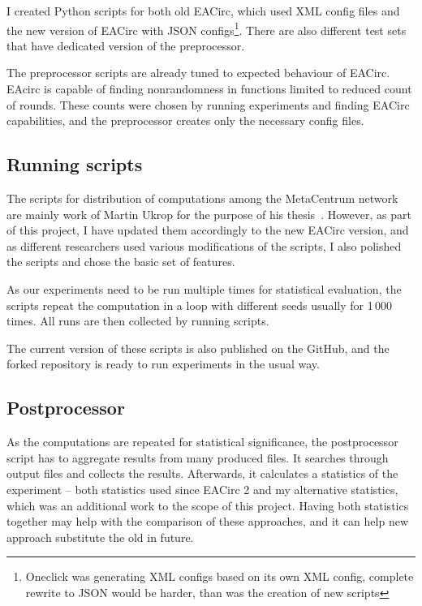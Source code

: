 \documentclass[
  print, %
  Table,   %
  nolof,     %
  nolot,     %
  draft, %
  11pt, %
  oneside  %
]{fithesis3}
\begin{document}
I created Python scripts for both old EACirc, which used XML config files and the new version of EACirc with JSON configs\footnote{Oneclick was generating XML configs based on its own XML config, complete rewrite to JSON would be harder, than was the creation of new scripts}. There are also different test sets that have dedicated version of the preprocessor.

The preprocessor scripts are already tuned to expected behaviour of EACirc. EAcirc is capable of finding nonrandomness in functions limited to reduced count of rounds. These counts were chosen by running experiments and finding EACirc capabilities, and the preprocessor creates only the necessary config files.

\subsection{Running scripts}

The scripts for distribution of computations among the MetaCentrum network are mainly work of Martin Ukrop for the purpose of his thesis~\cite{ukropMgrThesis}. However, as part of this project, I have updated them accordingly to the new EACirc version, and as different researchers used various modifications of the scripts, I also polished the scripts and chose the basic set of features.

As our experiments need to be run multiple times for statistical evaluation, the scripts repeat the computation in a loop with different seeds usually for 1\,000 times. All runs are then collected by running scripts.

The current version of these scripts is also published on the GitHub, and the forked repository is ready to run experiments in the usual way.

\subsection{Postprocessor}

As the computations are repeated for statistical significance, the postprocessor script has to aggregate results from many produced files. It searches through output files and collects the results. Afterwards, it calculates a statistics of the experiment -- both statistics used since EACirc 2 and my alternative statistics, which was an additional work to the scope of this project. Having both statistics together may help with the comparison of these approaches, and it can help new approach substitute the old in future.
\end{document}
